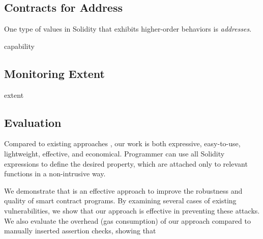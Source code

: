 \subsection*{\textbf{Contracts for Address}}

One type of values in Solidity that exhibits higher-order behaviors is \emph{addresses}.

capability


\subsection*{\textbf{Monitoring Extent}}

extent



\subsection*{\textbf{Evaluation}}

Compared to existing approaches , our work is both expressive,
easy-to-use, lightweight, effective, and economical.
Programmer can use all Solidity expressions to define the desired property,
which are attached only to relevant functions in a non-intrusive way.

We demonstrate that \lang is an effective approach to improve the robustness
and quality of smart contract programs.
By examining several cases of existing vulnerabilities, we show that our
approach is effective in preventing these attacks.
We also evaluate the overhead (gas consumption) of our approach compared to
manually inserted assertion checks, showing that 





